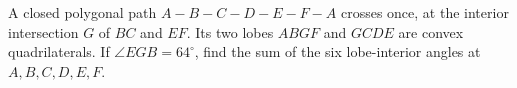 A closed polygonal path $A-B-C-D-E-F-A$ crosses once, at the interior intersection $G$ of $BC$ and $EF$. Its two lobes $ABGF$ and $GCDE$ are convex quadrilaterals. If $\angle EGB=64^\circ$, find the sum of the six lobe-interior angles at $A,B,C,D,E,F$.
